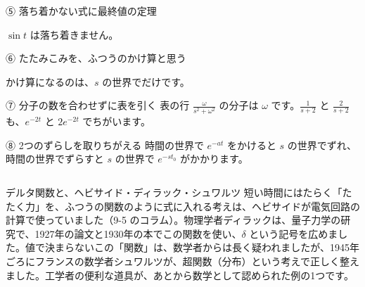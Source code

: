\begingroup{}%
\noindent\begin{minipage}[t]{0.485\linewidth}\vspace{0pt}
\begin{tsumazuki}{⑤ 落ち着かない式に最終値の定理}
\raggedright{}
$\sin t$ は落ち着きません。
\end{tsumazuki}
\end{minipage}\hfill
\begin{minipage}[t]{0.485\linewidth}\vspace{0pt}
\begin{tsumazuki}{⑥ たたみこみを、ふつうのかけ算と思う}
\raggedright{}
かけ算になるのは、$s$ の世界でだけです。
\end{tsumazuki}
\end{minipage}\par
\endgroup

\begin{tsumazuki}{⑦ 分子の数を合わせずに表を引く}
表の行 $\frac{\omega}{s^2+\omega^2}$ の分子は $\omega$ です。$\frac{1}{s+2}$ と $\frac{2}{s+2}$ も、$e^{-2t}$ と $2e^{-2t}$ でちがいます。
\end{tsumazuki}

\begin{tsumazuki}{⑧ 2つのずらしを取りちがえる}
時間の世界で $e^{-at}$ をかけると $s$ の世界でずれ、時間の世界でずらすと $s$ の世界で $e^{-st_0}$ がかかります。
\end{tsumazuki}




\begin{column}{デルタ関数と、ヘビサイド・ディラック・シュワルツ}
短い時間にはたらく「たたく力」を、ふつうの関数のように式に入れる考えは、ヘビサイドが電気回路の計算で使っていました（9-5 のコラム）。物理学者ディラックは、量子力学の研究で、1927年の論文と1930年の本でこの関数を使い、$\delta$ という記号を広めました。値で決まらないこの「関数」は、数学者からは長く疑われましたが、1945年ごろにフランスの数学者シュワルツが、超関数（分布）という考えで正しく整えました。工学者の便利な道具が、あとから数学として認められた例の1つです。
\end{column}

